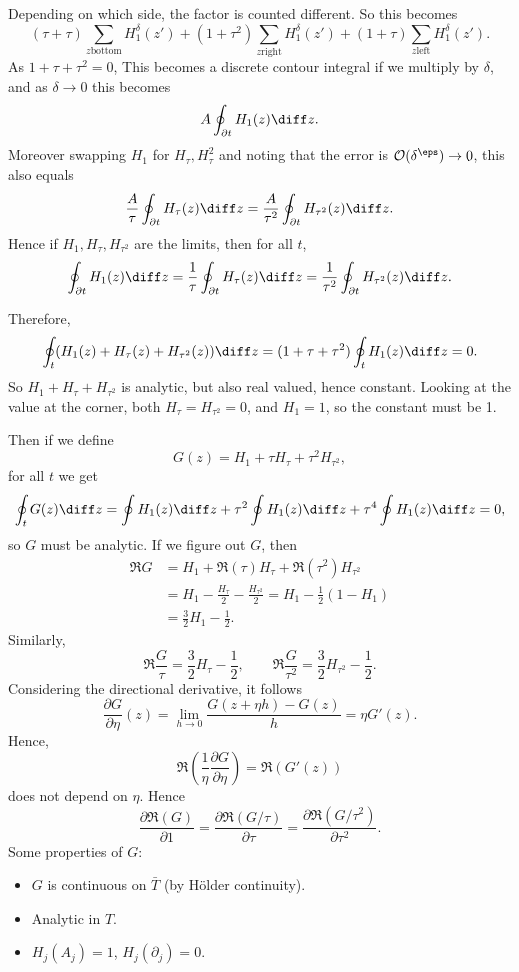 \documentclass[12pt]{article}
\begin{document}
Depending on which side, the factor is counted different. So this becomes
\[
	(\tau + \tau) \sum_{z \text{bottom}} H_1^{\delta}(z') + (1 + \tau^2) \sum_{z \text{right}} H_1^{\delta}(z') + (1 + \tau) \sum_{z \text{left}} H_1^{\delta}(z').
\]
As $1 + \tau + \tau^2 = 0$, This becomes a discrete contour integral if we multiply by $\delta$, and as $\delta \to 0$ this becomes
\[
A \oint_{\partial t} H_1(z) \diff z.
\]
Moreover swapping $H_1$ for $H_\tau, H_\tau^2$ and noting that the error is $\mathcal{O}(\delta^{\eps}) \to 0$, this also equals
\[
\frac{A}{\tau} \oint_{\partial t}H_\tau(z) \diff z = \frac{A}{\tau^2} \oint_{\partial t} H_{\tau^2}(z) \diff z.
\]
Hence if $H_1, H_\tau, H_{\tau^2}$ are the limits, then for all $t$,
\[
\oint_{\partial t} H_1(z) \diff z = \frac{1}{\tau} \oint_{\partial t} H_{\tau}(z) \diff z = \frac{1}{\tau^2} \oint_{\partial t} H_{\tau^2} (z) \diff z.
\]

Therefore,
\[
\oint_t (H_1(z) + H_\tau(z) + H_{\tau^2}(z)) \diff z = (1 + \tau + \tau^2)\oint_t H_1(z) \diff z = 0.
\]
So $H_1 + H_\tau + H_{\tau^2}$ is analytic, but also real valued, hence constant. Looking at the value at the corner, both $H_\tau = H_{\tau^2} = 0$, and $H_1 = 1$, so the constant must be 1.

Then if we define
\[
G(z) = H_1 + \tau H_\tau + \tau^2H_{\tau^2},
\]
for all $t$ we get
\[
\oint_t G(z) \diff z = \oint H_1(z) \diff z + \tau^2 \oint H_1(z) \diff z + \tau^{4} \oint H_1(z) \diff z = 0,
\]
so $G$ must be analytic. If we figure out $G$, then
\begin{align*}
	\Re G &= H_1 + \Re (\tau) H_\tau + \Re (\tau^2) H_{\tau^2} \\
	      &= H_1 - \frac{H_\tau}{2} - \frac{H_{\tau^2}}{2} = H_1 - \frac 12(1 - H_1) \\
	      &= \frac 32 H_1 - \frac 12.
\end{align*}
Similarly,
\[
\Re \frac{G}{\tau} = \frac{3}{2} H_\tau - \frac 12, \qquad \Re \frac{G}{\tau^2} = \frac 32 H_{\tau^2} - \frac 12.
\]
Considering the directional derivative, it follows
\[
\frac{\partial G}{\partial \eta}(z) = \lim_{h \to 0} \frac{G(z + \eta h) - G(z)}{h} = \eta G'(z).
\]
Hence,
\[
\Re \left( \frac 1\eta \frac{\partial G}{\partial \eta} \right) = \Re (G'(z))
\]
does not depend on $\eta$. Hence
\[
\frac{\partial \Re(G)}{\partial 1} = \frac{\partial \Re(G/\tau)}{\partial \tau} = \frac{\partial \Re(G/\tau^2)}{\partial \tau^2}.
\]
Some properties of $G$:
\begin{itemize}
	\item $G$ is continuous on $\bar T$ (by H\"older continuity).
	\item Analytic in $T$.
	\item $H_j(A_j) = 1$, $H_j(\partial_j) = 0$.
\end{itemize}
\end{document}
